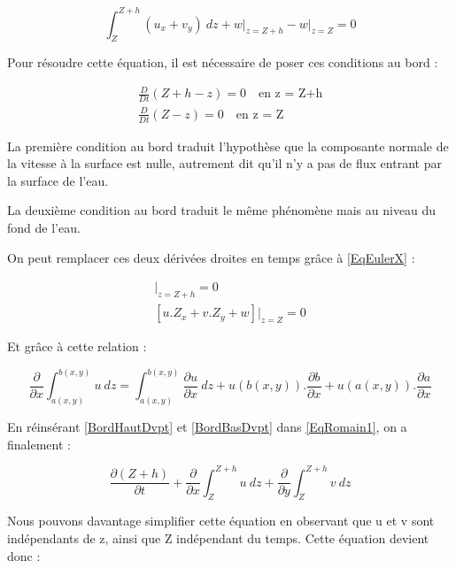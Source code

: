 \documentclass[
11pt, %
francais, %
singlespacing, %
headsepline, %
]{MastersDoctoralThesis} %
\begin{document}
\begin{equation}
\int_{Z}^{Z+h} (u_x + v_y) \ dz + w\vert_{z=Z+h}-w\vert_{z=Z} = 0 
\label{EqRomain1}
\end{equation}

Pour résoudre cette équation, il est nécessaire de poser ces conditions au bord :

\begin{align}
\frac{D}{Dt} (Z+h-z) = 0 \quad \text{en z = Z+h} \label{BordHaut}\\
\frac{D}{Dt} (Z-z) = 0 \quad \text{en z = Z} \label{BordBas}
\end{align}

La première condition au bord traduit l'hypothèse que la composante normale de la vitesse à la surface est nulle, autrement dit qu'il n'y a pas de flux entrant par la surface de l'eau.

\medskip

La deuxième condition au bord traduit le même phénomène mais au niveau du fond de l'eau.

\bigskip

On peut remplacer ces deux dérivées droites en temps grâce à \ref{EqEulerX} :

\begin{align}
[ \frac{\partial (Z+h)}{\partial t} + u.\frac{\partial (Z+h)}{\partial x} + v.\frac{\partial (Z+h)}{\partial y} - w ] \vert _{z=Z+h} = 0 \label{BordHautDvpt} \\
[ u.Z_x + v.Z_y + w ] \vert _{z=Z} = 0 \label{BordBasDvpt}
\end{align}

Et grâce à cette relation :

\begin{equation}
\frac{\partial}{\partial x} \int_{a(x,y)}^{b(x,y)} u \ dz = \int_{a(x,y)}^{b(x,y)} \frac{\partial u}{\partial x} \ dz + u(b(x,y)).\frac{\partial b}{\partial x} + u(a(x,y)).\frac{\partial a}{\partial x}
\end{equation}

En réinsérant \ref{BordHautDvpt} et \ref{BordBasDvpt} dans \ref{EqRomain1}, on a finalement : 

\begin{equation}
\frac{\partial (Z+h)}{\partial t} + \frac{\partial}{\partial x} \int_{Z}^{Z+h} u \ dz +  \frac{\partial}{\partial y} \int_{Z}^{Z+h} v \ dz
\end{equation}

Nous pouvons davantage simplifier cette équation en observant que u et v sont indépendants de z, ainsi que Z indépendant du temps. Cette équation devient donc :
\end{document}
